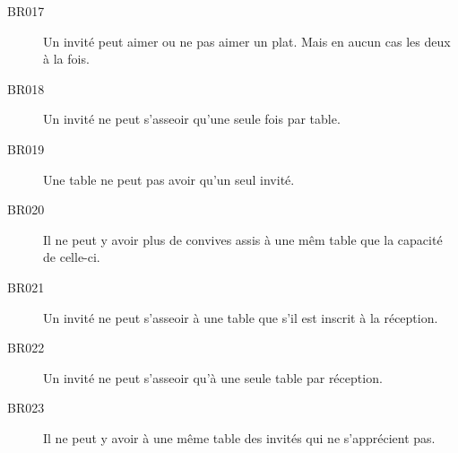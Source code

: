 \begin{description}
  \item[BR017]  Un invité peut aimer ou ne pas aimer un plat. Mais en aucun cas les deux à la fois.
  \item[BR018]  Un invité ne peut s'asseoir qu'une seule fois par table.
  \item[BR019]  Une table ne peut pas avoir qu'un seul invité.
  \item[BR020]  Il ne peut y avoir plus de convives assis à une mêm table que la capacité de celle-ci.
  \item[BR021]  Un invité ne peut s'asseoir à une table que s'il est inscrit à la réception.
  \item[BR022]  Un invité ne peut s'asseoir qu'à une seule table par réception.
  \item[BR023]  Il ne peut y avoir à une même table des invités qui ne s'apprécient pas.
\end{description}

